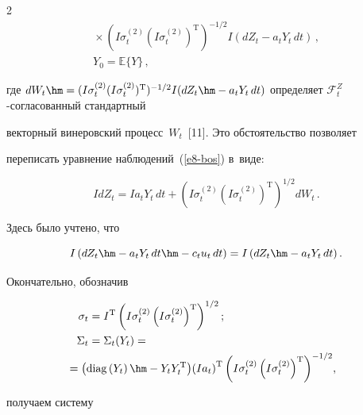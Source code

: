 \begin{multicols}{2}
\begin{multline*}
     {}\times \left( I\sigma_t^{(2)} \left( I\sigma_t^{(2)}\right)^{\mathrm{T}}\right)^{-1/2} 


I\left( dZ_t-a_tY_t\,dt\right)\,,\\


 Y_0=\mathbb{E}\{Y\}\,,


     \end{multline*}


где $dW_t\hm= (I\sigma_t^{(2)} (I\sigma_t^{(2)})^{\mathrm{T}})^{-1/2} I(dZ_t\hm- a_t Y_t\, 


dt)$ определяет $\mathcal{F}_t^Z$-со\-гла\-со\-ван\-ный стандартный 


векторный винеровский процесс~$W_t$~[11]. Это обстоятельство позволяет 


переписать уравнение наблюдений~(\ref{e8-bos}) в~виде:


$$


IdZ_t=Ia_t Y_t\,dt+\left( I\sigma_t^{(2)} \left( 


I\sigma_t^{(2)} \right)^{\mathrm{T}} \right)^{1/2} dW_t\,.


$$


Здесь было учтено, что 


$$


I\left(dZ_t \hm-a_t Y_t \,dt \hm- c_t u_t\, dt\right)= 


I\left(dZ_t\hm- a_t Y_t \,dt\right).


$$


     


     Окончательно, обозначив 


     \begin{align*}


          \sigma_t&= I^{\mathrm{T}}\left( I\sigma_t^{(2)} \left( 


I\sigma_t^{(2)}\right)^{\mathrm{T}}\right)^{1/2};\\


\Sigma_t&= \Sigma_t(Y_t) ={}\\


&\hspace*{-7mm} {}=


\left( \mathrm{diag}\left(Y_t\right) \hm-Y_tY_t^{\mathrm{T}}\right)\! \left(I a_t\right)^{\mathrm{T}} \left( 


I\sigma_t^{(2)}\left( I\sigma_t^{(2)}\right)^{\mathrm{T}}\right)^{-1/2}\!,


\end{align*}


 получаем систему 



\end{multicols}
